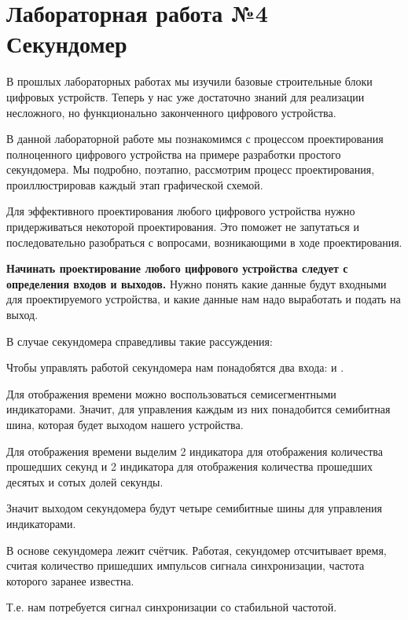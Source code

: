 \chapter{Лабораторная работа №4\\Секундомер} 

\par{В прошлых лабораторных работах мы изучили базовые строительные блоки цифровых устройств. Теперь у нас уже достаточно знаний для реализации несложного, но функционально законченного цифрового устройства.}

\par{В данной лабораторной работе мы познакомимся с процессом проектирования полноценного цифрового устройства на примере разработки простого секундомера. Мы подробно, поэтапно, рассмотрим процесс проектирования, проиллюстрировав каждый этап графической схемой.}

\par{Для эффективного проектирования любого цифрового устройства нужно придерживаться некоторой  проектирования. Это поможет не запутаться и последовательно разобраться с вопросами, возникающими в ходе проектирования.}

\par{\textbf{Начинать проектирование любого цифрового устройства следует с определения входов и выходов.} Нужно понять какие данные будут входными для проектируемого устройства, и какие данные нам надо выработать и подать на выход.}

\vspace{4mm}
\par{В случае секундомера справедливы такие рассуждения:}
\par{Чтобы управлять работой секундомера нам понадобятся два входа:  и .}
\par{Для отображения времени можно воспользоваться семисегментными индикаторами. Значит, для управления каждым из них понадобится семибитная шина, которая будет выходом нашего устройства.}
\par{Для отображения времени выделим 2 индикатора для отображения количества прошедших секунд и 2 индикатора для отображения количества прошедших десятых и сотых долей секунды.}
\par{Значит выходом секундомера будут четыре семибитные шины для управления индикаторами.}
\par{В основе секундомера лежит счётчик. Работая, секундомер отсчитывает время, считая количество пришедших импульсов сигнала синхронизации, частота которого заранее известна.}
\par{Т.е. нам потребуется сигнал синхронизации со стабильной частотой.}
\vspace{4mm}

